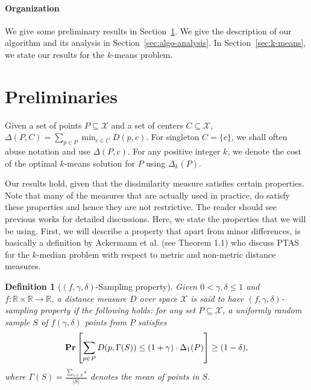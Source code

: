 \documentclass[11pt]{article}
\newtheorem{definition}{Definition}
\newcommand{\pr}{{\bf Pr}}
\begin{document}
\paragraph{Organization} We give some preliminary results in Section~\ref{sec:pre}. We give the description of our algorithm and its analysis in Section~\ref{sec:algo-analysis}. In Section~\ref{sec:k-means}, we state our results for the $k$-means problem.












\section{Preliminaries}
\label{sec:pre}

Given a set of points $P \subseteq \mathcal{X}$ and a set of centers $C \subseteq \mathcal{X}$, $\Delta(P, C) = \sum_{p \in P} \min_{c \in C} D(p, c)$.
For singleton $C = \{c\}$, we shall often abuse notation and use $\Delta(P, c)$.
For any positive integer $k$, we denote the cost of the optimal $k$-means solution for $P$ using $\Delta_k(P)$.  

Our results hold, given that the dissimilarity measure satisfies certain properties. 
Note that many of the measures that are actually used in practice, do satisfy these properties and hence they are not restrictive. 
The reader should see previous works \cite{jks12, abs10} for detailed discussions.
Here, we state the properties that we will be using.
First, we will describe a property that apart from minor differences, is basically a definition by Ackermann et al. \cite{abs10} (see Theorem 1.1) who discuss PTAS 
for the $k$-median problem with respect to metric and non-metric distance measures.

\begin{definition}[$(f, \gamma, \delta)$-Sampling property]
Given $0 < \gamma, \delta \leq 1$ and $f: \mathbb{R} \times \mathbb{R} \rightarrow \mathbb{R}$, a distance measure $D$ over space $\mathcal{X}$ is said to have $(f, \gamma, \delta)$-sampling property if the following holds:
for any set $P \subseteq \mathcal{X}$, a uniformly random sample $S$ of $f(\gamma, \delta)$ points from $P$ satisfies 
$$\pr\left[\sum_{p \in P} D(p, \Gamma(S)) \leq (1+\gamma) \cdot \Delta_1(P)\right] \geq (1 - \delta),$$
where $\Gamma(S) = \frac{\sum_{s \in S} s}{|S|}$ denotes the mean of points in $S$.
\end{definition}
\end{document}
